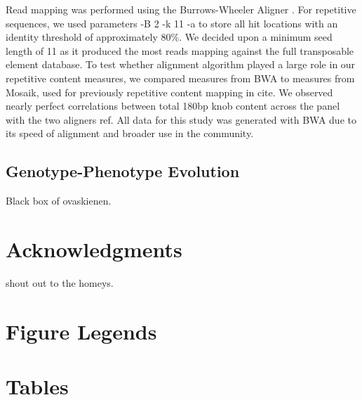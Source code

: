 \documentclass[10pt]{article}
\begin{document}
Read mapping was performed using the Burrows-Wheeler Aligner \cite{li2009fast}.
For repetitive sequences, we used parameters -B 2 -k 11 -a to store all hit locations with an identity threshold of approximately 80\%.
We decided upon a minimum seed length of 11 as it produced the most reads mapping against the full transposable element database.
To test whether alignment algorithm played a large role in our repetitive content measures, we compared measures from BWA to measures from Mosaik, used for previously repetitive content mapping in cite{}.
We observed nearly perfect correlations between total 180bp knob content across the panel with the two aligners ref{}.
All data for this study was generated with BWA due to its speed of alignment and broader use in the community.

\subsection*{Genotype-Phenotype Evolution}
Black box of ovaskienen.

\section*{Acknowledgments}
shout out to the homeys.



\section*{Figure Legends}


\section*{Tables}
\end{document}
